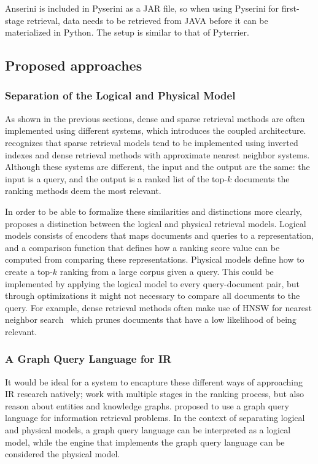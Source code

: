 Anserini is included in Pyserini as a JAR file, so when using Pyserini for first-stage retrieval, data needs to be retrieved from JAVA before it can be materialized in Python. The setup is similar to that of Pyterrier. 

\subsection{Proposed approaches}
\subsubsection{Separation of the Logical and Physical Model}
As shown in the previous sections, dense and sparse retrieval methods are often implemented using different systems, which introduces the coupled architecture. \citet{seperation-logical-physical} recognizes that sparse retrieval models tend to be implemented using inverted indexes and dense retrieval methods with approximate nearest neighbor systems. Although these systems are different, the input and the output are the same: the input is a query, and the output is a ranked list of the top-$k$ documents the ranking methods deem the most relevant. 

In order to be able to formalize these similarities and distinctions more clearly, \citeauthor{seperation-logical-physical} proposes a distinction between the logical and physical retrieval models. Logical models consists of encoders that maps documents and queries to a representation, and a comparison function that defines how a ranking score value can be computed from comparing these representations. Physical models define how to create a top-$k$ ranking from a large corpus given a query. This could be implemented by applying the logical model to every query-document pair, but through optimizations it might not necessary to compare all documents to the query. For example, dense retrieval methods often make use of HNSW for nearest neighbor search~\citep{faiss} which prunes documents that have a low likelihood of being relevant. 

\subsubsection{A Graph Query Language for IR}
It would be ideal for a system to encapture these different ways of approaching IR research natively; work with multiple stages in the ranking process, but also reason about entities and knowledge graphs. 
\citet{need-graph-db} proposed to use a graph query language for information retrieval problems. In the context of separating logical and physical models, a graph query language can be interpreted as a logical model, while the engine that implements the graph query language can be considered the physical model.

